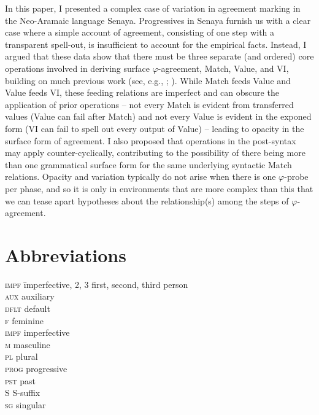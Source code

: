 \documentclass[output=paper
,modfonts
,nonflat]{langsci/langscibook}
\begin{document}
In this paper, I presented a complex case of variation in agreement marking in the Neo-Aramaic language Senaya. Progressives in Senaya furnish us with a clear case where a simple account of agreement, consisting of one step with a transparent spell-out, is insufficient to account for the empirical facts. Instead, I argued that these data show that there must be three separate (and ordered) core operations involved in deriving surface $\varphi$-agreement, Match, Value, and VI, building on much previous work (see, e.g., \citealt{vanKoppen07,BBP09,ArregiNevins12,BhattWalkow13,Bonet13,Marusicetal15, Smith17, AtlamazBakerTA}; ). While Match feeds Value and Value feeds VI, these feeding relations are imperfect and can obscure the application of prior operations -- not every Match is evident from transferred values (Value can fail after Match) and not every Value is evident in the exponed form (VI can fail to spell out every output of Value) -- leading to opacity in the surface form of agreement. I also proposed that operations in the post-syntax may apply counter-cyclically, contributing to the possibility of there being more than one grammatical surface form for the same underlying syntactic Match relations. Opacity and variation typically do not arise when there is one $\varphi$-probe per phase, and so it is only in environments that are more complex than this that we can tease apart hypotheses about the relationship(s) among the steps of $\varphi$-agreement.

\section*{Abbreviations}

\begin{multicols}{2}
	\begin{tabbing}
		\textsc{impf}\hspace{5mm} \= imperfective, 2, 3 \> first, second, third person\\
\textsc{aux} \> auxiliary\\
\textsc{dflt} \> default\\
 \textsc{f} \> feminine\\
\textsc{impf} \> imperfective\\
 \textsc{m} \> masculine\\
 \textsc{pl} \> plural\\
 \textsc{prog} \> progressive\\
 \textsc{pst} \> past\\
 S \> S-suffix\\
 \textsc{sg} \> singular\\
	\end{tabbing} 
\end{multicols}
\end{document}
